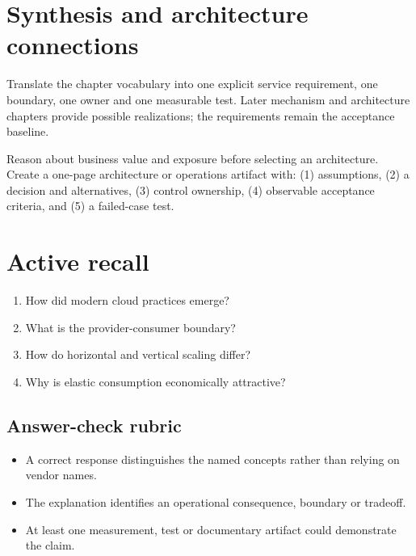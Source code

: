 \documentclass[10pt,letterpaper]{article}
\begin{document}
\section{Synthesis and architecture connections}
Translate the chapter vocabulary into one explicit service requirement, one boundary, one owner and one measurable test. Later mechanism and architecture chapters provide possible realizations; the requirements remain the acceptance baseline.
\begin{workbox}[title={Applied deliverable}]
Reason about business value and exposure before selecting an architecture.\\[4pt]Create a one-page architecture or operations artifact with: (1) assumptions, (2) a decision and alternatives, (3) control ownership, (4) observable acceptance criteria, and (5) a failed-case test.
\end{workbox}
\section{Active recall}
\begin{enumerate}
\item How did modern cloud practices emerge?
\item What is the provider-consumer boundary?
\item How do horizontal and vertical scaling differ?
\item Why is elastic consumption economically attractive?
\end{enumerate}
\subsection{Answer-check rubric}
\begin{itemize}
\item A correct response distinguishes the named concepts rather than relying on vendor names.
\item The explanation identifies an operational consequence, boundary or tradeoff.
\item At least one measurement, test or documentary artifact could demonstrate the claim.
\end{itemize}
\end{document}
